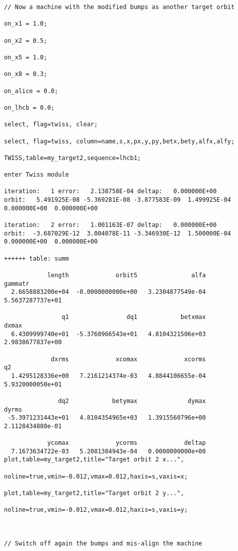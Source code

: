 \begin{verbatim}
// Now a machine with the modified bumps as another target orbit 

on_x1 = 1.0;

on_x2 = 0.5;

on_x5 = 1.0;

on_x8 = 0.3;

on_alice = 0.0;

on_lhcb = 0.0;

select, flag=twiss, clear;

select, flag=twiss, column=name,s,x,px,y,py,betx,bety,alfx,alfy;

TWISS,table=my_target2,sequence=lhcb1; 

enter Twiss module
  
iteration:   1 error:   2.138758E-04 deltap:   0.000000E+00
orbit:   5.491925E-08 -5.369281E-08 -3.877583E-09  1.499925E-04  0.000000E+00  0.000000E+00
  
iteration:   2 error:   1.001163E-07 deltap:   0.000000E+00
orbit:  -3.687029E-12  3.004078E-11 -3.346930E-12  1.500000E-04  0.000000E+00  0.000000E+00

++++++ table: summ

            length             orbit5               alfa            gammatr 
  2.6658883200e+04  -0.0000000000e+00   3.2304877549e-04   5.5637287737e+01 

                q1                dq1            betxmax              dxmax 
  6.4309999740e+01  -5.3760966543e+01   4.8104321506e+03   2.9838677837e+00 

             dxrms             xcomax             xcorms                 q2 
  1.4295128336e+00   7.2161214374e-03   4.8844106655e-04   5.9320000050e+01 

               dq2            betymax              dymax              dyrms 
 -5.3971231443e+01   4.8104354965e+03   1.3915560796e+00   2.1128434880e-01 

            ycomax             ycorms             deltap 
  7.1673634722e-03   5.2081384943e-04   0.0000000000e+00 
plot,table=my_target2,title="Target orbit 2 x...",

noline=true,vmin=-0.012,vmax=0.012,haxis=s,vaxis=x;

plot,table=my_target2,title="Target orbit 2 y...",

noline=true,vmin=-0.012,vmax=0.012,haxis=s,vaxis=y;



// Switch off again the bumps and mis-align the machine


\end{verbatim}
